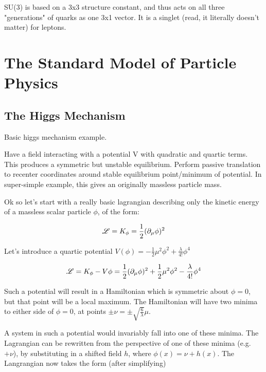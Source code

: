         SU(3) is based on a 3x3 structure constant, and thus acts on all three "generations" of quarks as one 3x1 vector.
        It is a singlet (read, it literally doesn't matter) for leptons.
        
        \cite{Osborn_notes}
        \cite{Peskin_book}
        \cite{Halzen_book}


        

\section{The Standard Model of Particle Physics}
    \subsection{The Higgs Mechanism}

        Basic higgs mechanism example.

        Have a field interacting with a potential V with quadratic and quartic terms.
        This produces a symmetric but unstable equilibrium.
        Perform passive translation to recenter coordinates around stable equilibrium point/minimum of potential.
        In super-simple example, this gives an originally massless particle mass.

        Ok so let's start with a really basic lagrangian describing only the kinetic energy of a massless scalar particle $\phi$, of the form:

        \begin{equation}
            \mathscr{L} = K_{\phi} = \frac{1}{2} (\partial_{\mu} \phi)^2
        \end{equation}

        Let's introduce a quartic potential $V(\phi) = -\frac{1}{2} \mu^2 \phi^2 + \frac{\lambda}{4!} \phi^4$

        \begin{equation}
            \mathscr{L} = K_{\phi} - V{\phi} = \frac{1}{2} (\partial_{\mu} \phi)^2 
                +\frac{1}{2} \mu^2 \phi^2 - \frac{\lambda}{4!} \phi^4
        \end{equation}

        Such a potential will result in a Hamiltonian which is symmetric about $\phi=0$, but that point will be a local maximum.%
        The Hamiltonian will have two minima to either side of $\phi=0$, at points $\pm \nu = \pm \sqrt{\frac{6}{\lambda}} \mu$.

        A system in such a potential would invariably fall into one of these minima.
        The Lagrangian can be rewritten from the perspective of one of these minima (e.g.\ $+\nu$),
            by substituting in a shifted field $h$, where $\phi(x)=\nu+h(x)$.
        The Langrangian now takes the form (after simplifying)

